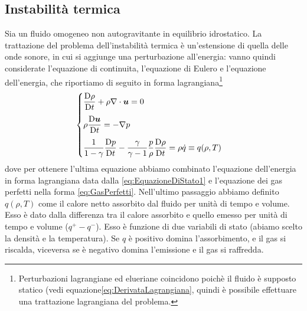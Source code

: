 \subsection{Instabilità termica}
Sia un fluido omogeneo non autogravitante in equilibrio idrostatico. La trattazione del problema dell'instabilità termica è un'estensione di quella delle onde sonore, in cui si aggiunge una perturbazione all'energia: vanno quindi considerate l'equazione di continuita, l'equazione di Eulero e l'equazione dell'energia, che riportiamo di seguito in forma lagrangiana\footnote{Perturbazioni lagrangiane ed elueriane coincidono poichè il fluido è supposto statico (vedi equazione\ref{eq:DerivataLagrangiana}, quindi è possibile effettuare una trattazione lagrangiana del problema.}
\begin{equation}
\begin{cases}
\derL{\rho}{t}+\rho \scal{\nabla}{u}=0 \\[10pt]
\rho \derL{\V{u}}{t} = -\Grad p \\[10pt]
\inv{1-\gamma}\derL{p}{t} - \dfrac{\gamma}{\gamma-1}\dfrac{p}{\rho} \derL{\rho}{t} = \rho \dot{q} \equiv q(\rho,T) \label{eq:InstabilitàTermica1}
\end{cases}
\end{equation}
dove per ottenere l'ultima equazione abbiamo combinato l'equazione dell'energia in forma lagrangiana data dalla \ref{eq:EquazioneDiStato1} e l'equazione dei gas perfetti nella forma \ref{eq:GasPerfetti}.
Nell'ultimo passaggio abbiamo definito $q(\rho,T)$ come il calore netto assorbito dal fluido per unità di tempo e volume. Esso è dato dalla differenza tra il calore assorbito e quello emesso per unità di tempo e volume ($q^+-q^-$). Esso è funzione di due variabili di stato (abiamo scelto la densità e la temperatura). Se $q$ è positivo domina l'assorbimento, e il gas si riscalda, viceversa se è negativo domina l'emissione e il gas si raffredda.



